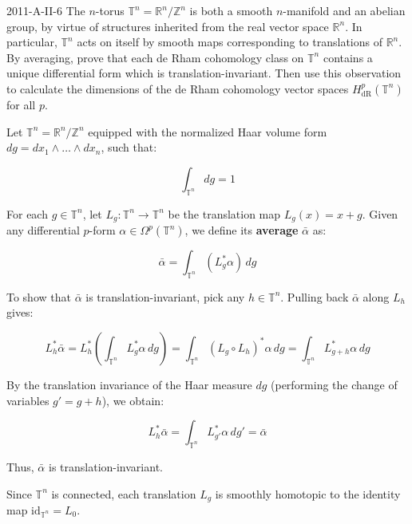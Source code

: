 \documentclass{article}
\begin{document}
	\begin{prb}{2011-A-II-6}
		The $n$-torus $\mathbb{T}^{n} = \mathbb{R}^{n}/\mathbb{Z}^{n}$ is both a smooth $n$-manifold and an abelian group, by virtue of structures inherited from the real vector space $\mathbb{R}^{n}$. In particular, $\mathbb{T}^{n}$ acts on itself by smooth maps corresponding to translations of $\mathbb{R}^{n}$. By averaging, prove that each de Rham cohomology class on $\mathbb{T}^{n}$ contains a unique differential form which is translation-invariant. Then use this observation to calculate the dimensions of the de Rham cohomology vector spaces $H^{p}_{\text{dR}}(\mathbb{T}^{n})$ for all $p$. 
	\end{prb}
	Let $\mathbb{T}^n = \mathbb{R}^n / \mathbb{Z}^n$ equipped with the normalized Haar volume form $dg = dx_1 \wedge \dots \wedge dx_n$, such that:
	
	\begin{equation*}
		\int_{\mathbb{T}^n} dg = 1
	\end{equation*}
	
	For each $g \in \mathbb{T}^n$, let $L_g : \mathbb{T}^n \to \mathbb{T}^n$ be the translation map $L_g(x) = x + g$. Given any differential $p$-form $\alpha \in \Omega^p(\mathbb{T}^n)$, we define its \textbf{average} $\bar{\alpha}$ as:
	
	\begin{equation*}
		\bar{\alpha} = \int_{\mathbb{T}^n} (L_g^* \alpha) \, dg
	\end{equation*}
	
	To show that $\bar{\alpha}$ is translation-invariant, pick any $h \in \mathbb{T}^n$. Pulling back $\bar{\alpha}$ along $L_h$ gives:
	
	\begin{equation*}
		L_h^* \bar{\alpha} = L_h^* \left( \int_{\mathbb{T}^n} L_g^* \alpha \, dg \right) = \int_{\mathbb{T}^n} (L_g \circ L_h)^* \alpha \, dg = \int_{\mathbb{T}^n} L_{g+h}^* \alpha \, dg
	\end{equation*}
	
	By the translation invariance of the Haar measure $dg$ (performing the change of variables $g' = g + h$), we obtain:
	
	\begin{equation*}
		L_h^* \bar{\alpha} = \int_{\mathbb{T}^n} L_{g'}^* \alpha \, dg' = \bar{\alpha}
	\end{equation*}
	
	Thus, $\bar{\alpha}$ is translation-invariant.
	
	Since $\mathbb{T}^n$ is connected, each translation $L_g$ is smoothly homotopic to the identity map $\text{id}_{\mathbb{T}^n} = L_0$. 
	
\end{document}
